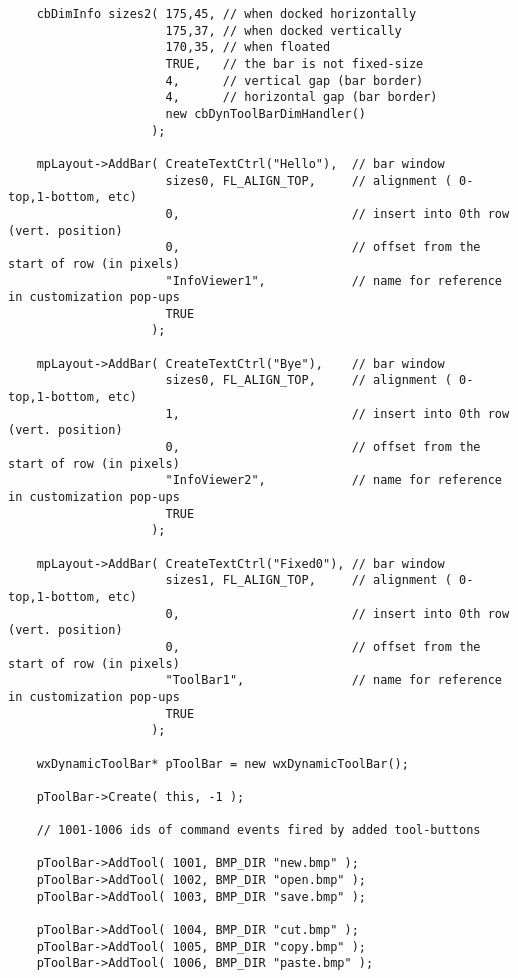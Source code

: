 \begin{verbatim}
    cbDimInfo sizes2( 175,45, // when docked horizontally
                      175,37, // when docked vertically
                      170,35, // when floated
                      TRUE,   // the bar is not fixed-size
                      4,      // vertical gap (bar border)
                      4,      // horizontal gap (bar border)
                      new cbDynToolBarDimHandler()
                    );

    mpLayout->AddBar( CreateTextCtrl("Hello"),  // bar window
                      sizes0, FL_ALIGN_TOP,     // alignment ( 0-top,1-bottom, etc)
                      0,                        // insert into 0th row (vert. position)
                      0,                        // offset from the start of row (in pixels)
                      "InfoViewer1",            // name for reference in customization pop-ups
                      TRUE
                    );

    mpLayout->AddBar( CreateTextCtrl("Bye"),    // bar window
                      sizes0, FL_ALIGN_TOP,     // alignment ( 0-top,1-bottom, etc)
                      1,                        // insert into 0th row (vert. position)
                      0,                        // offset from the start of row (in pixels)
                      "InfoViewer2",            // name for reference in customization pop-ups
                      TRUE
                    );

    mpLayout->AddBar( CreateTextCtrl("Fixed0"), // bar window
                      sizes1, FL_ALIGN_TOP,     // alignment ( 0-top,1-bottom, etc)
                      0,                        // insert into 0th row (vert. position)
                      0,                        // offset from the start of row (in pixels)
                      "ToolBar1",               // name for reference in customization pop-ups
                      TRUE
                    );

    wxDynamicToolBar* pToolBar = new wxDynamicToolBar();

    pToolBar->Create( this, -1 );

    // 1001-1006 ids of command events fired by added tool-buttons

    pToolBar->AddTool( 1001, BMP_DIR "new.bmp" );
    pToolBar->AddTool( 1002, BMP_DIR "open.bmp" );
    pToolBar->AddTool( 1003, BMP_DIR "save.bmp" );

    pToolBar->AddTool( 1004, BMP_DIR "cut.bmp" );
    pToolBar->AddTool( 1005, BMP_DIR "copy.bmp" );
    pToolBar->AddTool( 1006, BMP_DIR "paste.bmp" );


\end{verbatim}
